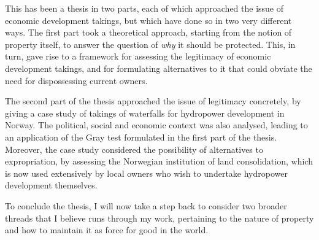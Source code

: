 This has been a thesis in two parts, each of which approached the issue of economic development takings, but which have done so in two very different ways. The first part took a theoretical approach, starting from the notion of property itself, to answer the question of {\it why} it should be protected. This, in turn, gave rise to a framework for assessing the legitimacy of economic development takings, and for formulating alternatives to it that could obviate the need for dispossessing current owners.

The second part of the thesis approached the issue of legitimacy concretely, by giving a case study of takings of waterfalls for hydropower development in Norway. The political, social and economic context was also analysed, leading to an application of the Gray test formulated in the first part of the thesis. Moreover, the case study considered the possibility of alternatives to expropriation, by assessing the Norwegian institution of land consolidation, which is now used extensively by local owners who wish to undertake hydropower development themselves.




To conclude the thesis, I will now take a step back to consider two broader threads that I believe runs through my work, pertaining to the nature of property and how to maintain it as force for good in the world.


